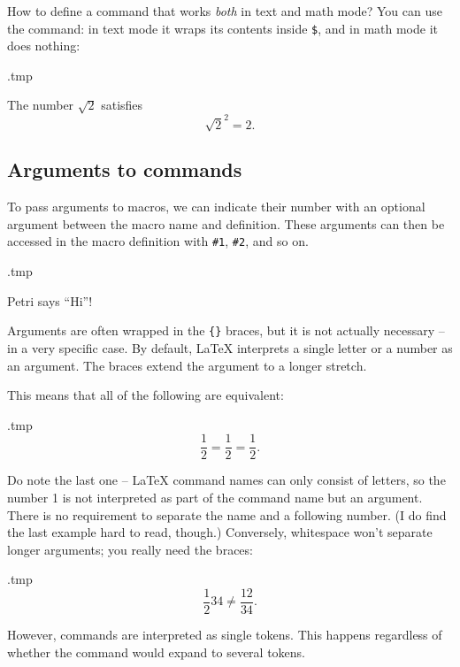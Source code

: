 How to define a command that works \emph{both} in text and math mode?
You can use the  command: in text mode it wraps its contents inside \verb|$|,
and in math mode it does nothing:
%
\begin{VerbatimOut}{\jobname.tmp}
\newcommand{\magic}{\ensuremath{\sqrt 2}}

The number \magic{} satisfies
\[
\magic^2 = 2.
\]
\end{VerbatimOut}
\ShowExample




%
\subsection{Arguments to commands}

To pass arguments to macros, we can indicate their number with an optional argument
between the macro name and definition.
These arguments can then be accessed in the macro definition with \verb|#1|, \verb|#2|, and so on.

\begin{VerbatimOut}{\jobname.tmp}
\newcommand{\say}[2]{#1 says ``#2''!}

\say{Petri}{Hi}
\end{VerbatimOut}
\ShowExample

Arguments are often wrapped in the \verb|{}| braces,
but it is not actually necessary -- in a very specific case.
By default, \LaTeX{} interprets a single letter or a number as an argument.
The braces extend the argument to a longer stretch.

This means that all of the following are equivalent:

\begin{VerbatimOut}{\jobname.tmp}
\[
\frac{1}{2}
= \frac 1 2
= \frac12.
\]
\end{VerbatimOut}
\ShowExample

Do note the last one -- \LaTeX{} command names can only consist of letters,
so the number 1 is not interpreted as part of the command name but an argument.
There is no requirement to separate the name and a following number.
(I do find the last example hard to read, though.)
Conversely, whitespace won't separate longer arguments; you really need the braces:

\begin{VerbatimOut}{\jobname.tmp}
\[
\frac 12 34
\neq \frac {12} {34}.
\]
\end{VerbatimOut}
\ShowExample

However, commands are interpreted as single tokens.
This happens regardless of whether the command would expand to several tokens.

